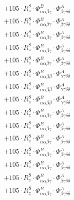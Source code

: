 \documentclass{article}
\begin{document}
\begin{subequations}
\begin{gather}
\begin{array}{c}
 \\[0.2em] 		 + 105 \cdot R_{z}^{8} \cdot \Phi{}^{B}_{\alpha{}\alpha{}\beta{}\gamma{}} \cdot \Phi{}^{A}_{\beta{}\gamma{}\delta{}\delta{}} 
 \\[0.2em] 		 + 105 \cdot R_{z}^{8} \cdot \Phi{}^{B}_{\alpha{}\alpha{}\beta{}\gamma{}} \cdot \Phi{}^{A}_{\beta{}\gamma{}\delta{}\delta{}} 
 \\[0.2em] 		 + 105 \cdot R_{z}^{8} \cdot \Phi{}^{B}_{\alpha{}\alpha{}\beta{}\gamma{}} \cdot \Phi{}^{A}_{\beta{}\gamma{}\delta{}\delta{}} 
 \\[0.2em] 		 + 105 \cdot R_{z}^{8} \cdot \Phi{}^{B}_{\alpha{}\alpha{}\beta{}\gamma{}} \cdot \Phi{}^{A}_{\beta{}\gamma{}\delta{}\delta{}} 
 \\[0.2em] 		 + 105 \cdot R_{z}^{8} \cdot \Phi{}^{B}_{\alpha{}\alpha{}\beta{}\gamma{}} \cdot \Phi{}^{A}_{\beta{}\gamma{}\delta{}\delta{}} 
 \\[0.2em] 		 + 105 \cdot R_{z}^{8} \cdot \Phi{}^{B}_{\alpha{}\alpha{}\beta{}\beta{}} \cdot \Phi{}^{A}_{\gamma{}\gamma{}\delta{}\delta{}} 
 \\[0.2em] 		 + 105 \cdot R_{z}^{8} \cdot \Phi{}^{B}_{\alpha{}\alpha{}\beta{}\beta{}} \cdot \Phi{}^{A}_{\gamma{}\gamma{}\delta{}\delta{}} 
 \\[0.2em] 		 + 105 \cdot R_{z}^{8} \cdot \Phi{}^{B}_{\alpha{}\alpha{}\beta{}\beta{}} \cdot \Phi{}^{A}_{\gamma{}\gamma{}\delta{}\delta{}} 
 \\[0.2em] 		 + 105 \cdot R_{z}^{8} \cdot \Phi{}^{B}_{\alpha{}\alpha{}\beta{}\gamma{}} \cdot \Phi{}^{A}_{\beta{}\gamma{}\delta{}\delta{}} 
 \\[0.2em] 		 + 105 \cdot R_{z}^{8} \cdot \Phi{}^{B}_{\alpha{}\alpha{}\beta{}\gamma{}} \cdot \Phi{}^{A}_{\beta{}\gamma{}\delta{}\delta{}} 
 \\[0.2em] 		 + 105 \cdot R_{z}^{8} \cdot \Phi{}^{B}_{\alpha{}\alpha{}\beta{}\gamma{}} \cdot \Phi{}^{A}_{\beta{}\gamma{}\delta{}\delta{}} 
 \\[0.2em] 		 + 105 \cdot R_{z}^{8} \cdot \Phi{}^{B}_{\alpha{}\alpha{}\beta{}\gamma{}} \cdot \Phi{}^{A}_{\beta{}\gamma{}\delta{}\delta{}} 
 \\[0.2em] 		 + 105 \cdot R_{z}^{8} \cdot \Phi{}^{B}_{\alpha{}\alpha{}\beta{}\gamma{}} \cdot \Phi{}^{A}_{\beta{}\gamma{}\delta{}\delta{}} 
 \\[0.2em] 		 + 105 \cdot R_{z}^{8} \cdot \Phi{}^{B}_{\alpha{}\alpha{}\beta{}\gamma{}} \cdot \Phi{}^{A}_{\beta{}\gamma{}\delta{}\delta{}} 
 \\[0.2em] 		 + 105 \cdot R_{z}^{8} \cdot \Phi{}^{B}_{\alpha{}\alpha{}\beta{}\gamma{}} \cdot \Phi{}^{A}_{\beta{}\gamma{}\delta{}\delta{}} 

\end{array}
\end{gather}
\end{subequations}
\end{document}
